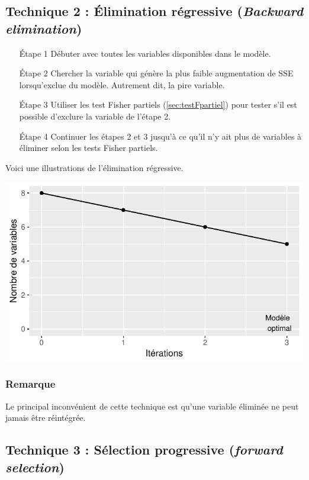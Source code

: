 \documentclass[11pt,french]{report}
\begin{document}
\subsection{Technique 2 : Élimination régressive (\emph{Backward elimination})}
\label{tech2}

\begin{itemize}
\item [Étape 1] Débuter avec toutes les variables disponibles dans le modèle.

\item [Étape 2] Chercher la variable qui génère la plus faible augmentation de SSE lorsqu'exclue du modèle. Autrement dit, la pire variable.

\item [Étape 3] Utiliser les test Fisher partiels (\ref{sec:testFpartiel}) pour tester s'il est possible d'exclure la variable de l'étape 2.

\item [Étape 4] Continuer les étapes 2 et 3 jusqu'à ce qu'il n'y ait plus de variables à éliminer selon les tests Fisher partiels.
\end{itemize}
\bigskip

Voici une illustrations de l'élimination régressive.

\includegraphics{notes_de_cours-026}

\subsubsection*{Remarque}
Le principal inconvénient de cette technique est qu'une variable éliminée ne peut jamais être réintégrée. 

\subsection{Technique 3 : Sélection progressive (\emph{forward selection})}
\label{tech3}
\end{document}
